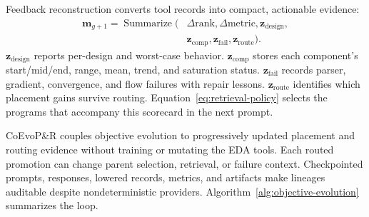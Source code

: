 Feedback reconstruction converts tool records into compact, actionable
evidence:
\begin{equation}
\begin{aligned}
\mathbf{m}_{g+1}=\operatorname{Summarize}\bigl(&
\Delta\mathrm{rank},\Delta\mathrm{metric},
\mathbf{z}_{\mathrm{design}},\\
&\mathbf{z}_{\mathrm{comp}},\mathbf{z}_{\mathrm{fail}},
\mathbf{z}_{\mathrm{route}}\bigr).
\end{aligned}
\label{eq:feedback-summary}
\end{equation}
$\mathbf{z}_{\mathrm{design}}$ reports per-design and worst-case behavior.
$\mathbf{z}_{\mathrm{comp}}$ stores each component's start/mid/end, range,
mean, trend, and saturation status. $\mathbf{z}_{\mathrm{fail}}$ records
parser, gradient, convergence, and flow failures with repair lessons.
$\mathbf{z}_{\mathrm{route}}$ identifies which placement gains survive routing.
Equation~\eqref{eq:retrieval-policy} selects the programs that accompany this
scorecard in the next prompt.

CoEvoP\&R couples objective evolution to progressively updated placement and
routing evidence without training or mutating the EDA tools. Each routed
promotion can change parent selection, retrieval, or failure context.
Checkpointed prompts, responses, lowered records, metrics, and artifacts make
lineages auditable despite nondeterministic providers. Algorithm~\ref{alg:objective-evolution}
summarizes the loop.

